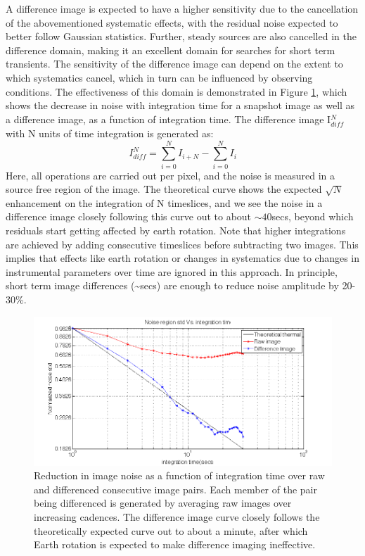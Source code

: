 \documentclass{aa}
\begin{document}
A  difference  image  is expected  to  have  a  higher  sensitivity due  to  the
cancellation of  the abovementioned systematic effects, with  the residual noise
expected to better follow Gaussian statistics.  Further, steady sources are also
cancelled in the  difference domain, making it an  excellent domain for searches
for short term  transients.  The sensitivity of the  difference image can depend
on the  extent to which systematics cancel,  which in turn can  be influenced by
observing  conditions.  The  effectiveness  of this  domain  is demonstrated  in
Figure  \ref{fig:Reduction-in-image}, which  shows  the decrease  in noise  with
integration  time for  a snapshot  image as  well as  a difference  image,  as a
function of integration time.  The difference image I$^N_{diff}$ with N units of
time integration is generated as:
\begin{equation}
I^N_{diff} = \sum\limits_{i=0}^N I_{i+N} - \sum\limits_{i=0}^N I_i \label{eq:diff_img}
\end{equation}
Here, all operations are  carried out per pixel, and the noise  is measured in a
source  free region  of the  image.  The  theoretical curve  shows  the expected
$\sqrt{N}$ enhancement on the integration of  N timeslices, and we see the noise
in a  difference image closely following  this curve out  to about $\sim40$secs,
beyond  which residuals  start getting  affected by  earth rotation.   Note that
higher  integrations  are  achieved  by  adding  consecutive  timeslices  before
subtracting  two images.   This  implies  that effects  like  earth rotation  or
changes in systematics  due to changes in instrumental  parameters over time are
ignored  in   this  approach.   In  principle,  short   term  image  differences
(\textasciitilde{}secs) are enough to reduce noise amplitude by 20-30\%.

\begin{figure}[tbh]
\includegraphics[width=1\columnwidth]{Figs/raw_vs_diff_vs_theory}

\caption{\label{fig:Reduction-in-image}Reduction in image noise as a function of
  integration  time over  raw  and differenced  consecutive  image pairs.   Each
  member of the pair being differenced is generated by averaging raw images over
  increasing  cadences.   The  difference   image  curve  closely   follows  the
  theoretically expected curve out to about a minute, after which Earth rotation
  is expected to make difference imaging ineffective.}
\end{figure}
\end{document}
